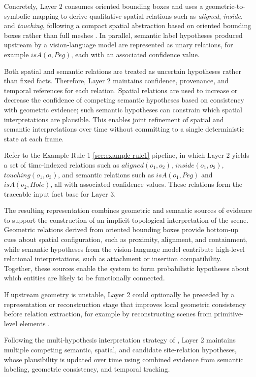 \documentclass[11pt,titlepage,openright]{book}
\begin{document}
Concretely, Layer 2 consumes oriented bounding boxes and uses a geometric-to-symbolic mapping to derive qualitative spatial relations such as \textit{aligned}, \textit{inside}, and \textit{touching}, following a compact spatial abstraction based on oriented bounding boxes rather than full meshes \citep{Haesler_2025}. In parallel, semantic label hypotheses produced upstream by a vision-language model are represented as unary relations, for example $isA(o, Peg)$, each with an associated confidence value.

Both spatial and semantic relations are treated as uncertain hypotheses rather than fixed facts. Therefore, Layer 2 maintains confidence, provenance, and temporal references for each relation. Spatial relations are used to increase or decrease the confidence of competing semantic hypotheses based on consistency with geometric evidence; such semantic hypotheses can constrain which spatial interpretations are plausible. This enables joint refinement of spatial and semantic interpretations over time without committing to a single deterministic state at each frame.


Refer to the Example Rule 1 \cref{sec:example-rule1} pipeline, in which Layer 2 yields a set of time-indexed relations such as $aligned(o_1,o_2)$, $inside(o_1,o_2)$, $touching(o_1,o_3)$, and semantic relations such as $isA(o_1, Peg)$ and $isA(o_2, Hole)$, all with associated confidence values. These relations form the traceable input fact base for Layer 3.

The resulting representation combines geometric and semantic sources of evidence to support the construction of an implicit topological interpretation of the scene. Geometric relations derived from oriented bounding boxes provide bottom-up cues about spatial configuration, such as proximity, alignment, and containment, while semantic hypotheses from the vision-language model contribute high-level relational interpretations, such as attachment or insertion compatibility. Together, these sources enable the system to form probabilistic hypotheses about which entities are likely to be functionally connected.

If upstream geometry is unstable, Layer 2 could optionally be preceded by a representation or reconstruction stage that improves local geometric consistency before relation extraction, for example by reconstructing scenes from primitive-level elements \citep{Mazur_2024}.


Following the multi-hypothesis interpretation strategy of \citet{WangEtAl2018}, Layer 2 maintains multiple competing semantic, spatial, and candidate site-relation hypotheses, whose plausibility is updated over time using combined evidence from semantic labeling, geometric consistency, and temporal tracking.
\end{document}
